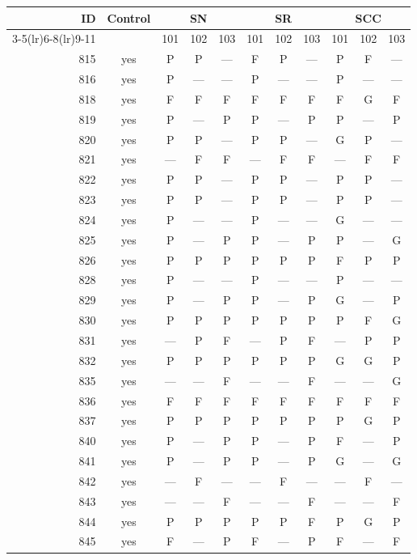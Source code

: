 \begin{table}[p]\centering\small
\begin{tabular*}{\textwidth}{@{\extracolsep{\fill}}rc*{9}{c}@{}}\toprule
ID & Control & \multicolumn{3}{c}{SN} & \multicolumn{3}{c}{SR} & \multicolumn{3}{c}{SCC}\\
\cmidrule(lr){3-5}\cmidrule(lr){6-8}\cmidrule(lr){9-11}
 & & 101 & 102 & 103 & 101 & 102 & 103 & 101 & 102 & 103\\\midrule
815 & yes & P & P & — & F & P & — & P & F & —\\
816 & yes & P & — & — & P & — & — & P & — & —\\
818 & yes & F & F & F & F & F & F & F & G & F\\
819 & yes & P & — & P & P & — & P & P & — & P\\
820 & yes & P & P & — & P & P & — & G & P & —\\
821 & yes & — & F & F & — & F & F & — & F & F\\
822 & yes & P & P & — & P & P & — & P & P & —\\
823 & yes & P & P & — & P & P & — & P & P & —\\
824 & yes & P & — & — & P & — & — & G & — & —\\
825 & yes & P & — & P & P & — & P & P & — & G\\
826 & yes & P & P & P & P & P & P & F & P & P\\
828 & yes & P & — & — & P & — & — & P & — & —\\
829 & yes & P & — & P & P & — & P & G & — & P\\
830 & yes & P & P & P & P & P & P & P & F & G\\
831 & yes & — & P & F & — & P & F & — & P & P\\
832 & yes & P & P & P & P & P & P & G & G & P\\
835 & yes & — & — & F & — & — & F & — & — & G\\
836 & yes & F & F & F & F & F & F & F & F & F\\
837 & yes & P & P & P & P & P & P & P & G & P\\
840 & yes & P & — & P & P & — & P & F & — & P\\
841 & yes & P & — & P & P & — & P & G & — & G\\
842 & yes & — & F & — & — & F & — & — & F & —\\
843 & yes & — & — & F & — & — & F & — & — & F\\
844 & yes & P & P & P & P & P & F & P & G & P\\
845 & yes & F & — & P & F & — & P & F & — & F\\

\end{tabular*}
\end{table}
